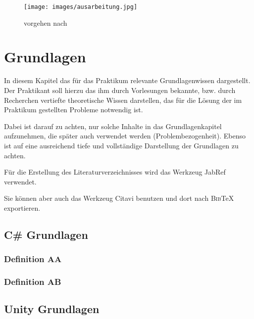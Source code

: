 \begin{figure}[htbp]
  \centering
  \texttt{[image: images/ausarbeitung.jpg]}
  \caption{vorgehen nach \autocite{Schmidt:Geschaeftsprozesse}}
  \label{fig:1}
\end{figure}


\chapter{Grundlagen}
\label{cha:grundlagen}

In diesem Kapitel das für das Praktikum relevante Grundlagenwissen 
dargestellt. Der Praktikant soll hierzu das ihm durch Vorlesungen 
bekannte, bzw. durch Recherchen vertiefte theoretische Wissen 
darstellen, das für die Lösung der im Praktikum gestellten Probleme 
notwendig ist.

Dabei ist darauf zu achten, nur solche Inhalte in das Grundlagenkapitel 
aufzunehmen, die später auch verwendet werden (Problembezogenheit). 
Ebenso ist auf eine ausreichend tiefe und vollständige Darstellung der 
Grundlagen zu achten.

Für die Erstellung des Literaturverzeichnisses 
wird das Werkzeug JabRef\autocite{JabRef:JabRef} verwendet. 

Sie können aber auch das Werkzeug Citavi\autocite{SAS:Citavi} benutzen
und dort nach \textsc{Bib}\TeX{} exportieren.

\section{C\# Grundlagen}
\label{sec:grundlagenc}

\subsection{Definition AA}
\label{sub:definitionaa}

\subsection{Definition AB}
\label{sub:definitionab}

\section{Unity Grundlagen}
\label{sec:grundlagenunity}

